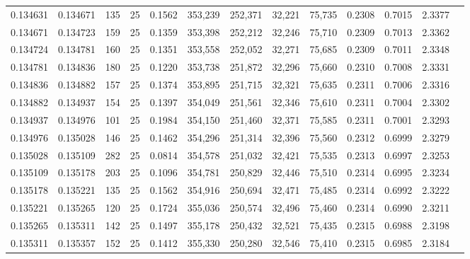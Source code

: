 \begin{tabular}{rrrrrrrrrrrrr}
0.134631 & 0.134671 &   135 &  25 &                                     0.1562 & 353,239 & 252,371 &  32,221 &  75,735 & 0.2308 & 0.7015 & 2.3377 \\
0.134671 & 0.134723 &   159 &  25 &                                     0.1359 & 353,398 & 252,212 &  32,246 &  75,710 & 0.2309 & 0.7013 & 2.3362 \\
0.134724 & 0.134781 &   160 &  25 &                                     0.1351 & 353,558 & 252,052 &  32,271 &  75,685 & 0.2309 & 0.7011 & 2.3348 \\
0.134781 & 0.134836 &   180 &  25 &                                     0.1220 & 353,738 & 251,872 &  32,296 &  75,660 & 0.2310 & 0.7008 & 2.3331 \\
0.134836 & 0.134882 &   157 &  25 &                                     0.1374 & 353,895 & 251,715 &  32,321 &  75,635 & 0.2311 & 0.7006 & 2.3316 \\
0.134882 & 0.134937 &   154 &  25 &                                     0.1397 & 354,049 & 251,561 &  32,346 &  75,610 & 0.2311 & 0.7004 & 2.3302 \\
0.134937 & 0.134976 &   101 &  25 &                                     0.1984 & 354,150 & 251,460 &  32,371 &  75,585 & 0.2311 & 0.7001 & 2.3293 \\
0.134976 & 0.135028 &   146 &  25 &                                     0.1462 & 354,296 & 251,314 &  32,396 &  75,560 & 0.2312 & 0.6999 & 2.3279 \\
0.135028 & 0.135109 &   282 &  25 &                                     0.0814 & 354,578 & 251,032 &  32,421 &  75,535 & 0.2313 & 0.6997 & 2.3253 \\
0.135109 & 0.135178 &   203 &  25 &                                     0.1096 & 354,781 & 250,829 &  32,446 &  75,510 & 0.2314 & 0.6995 & 2.3234 \\
0.135178 & 0.135221 &   135 &  25 &                                     0.1562 & 354,916 & 250,694 &  32,471 &  75,485 & 0.2314 & 0.6992 & 2.3222 \\
0.135221 & 0.135265 &   120 &  25 &                                     0.1724 & 355,036 & 250,574 &  32,496 &  75,460 & 0.2314 & 0.6990 & 2.3211 \\
0.135265 & 0.135311 &   142 &  25 &                                     0.1497 & 355,178 & 250,432 &  32,521 &  75,435 & 0.2315 & 0.6988 & 2.3198 \\
0.135311 & 0.135357 &   152 &  25 &                                     0.1412 & 355,330 & 250,280 &  32,546 &  75,410 & 0.2315 & 0.6985 & 2.3184 \\

\end{tabular}
